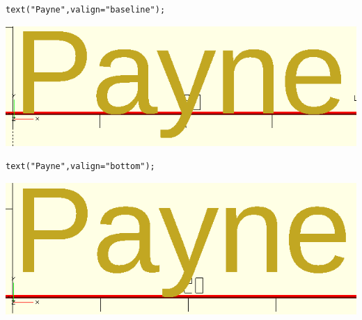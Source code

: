 \begin{center}
\begin{minipage}[]{.65\textwidth}%
 \begin{lstlisting}[numbers=none]
text("Payne",valign="baseline");
\end{lstlisting}%
\end{minipage}\hfill
\begin{minipage}[]{.35\textwidth}%
  \centering
  \includegraphics[width=.7\textwidth]{imagenes/payne-baseline}
\end{minipage}
\end{center}

\begin{center}
\begin{minipage}[]{.65\textwidth}%
 \begin{lstlisting}[numbers=none]
text("Payne",valign="bottom");
\end{lstlisting}%
\end{minipage}\hfill
\begin{minipage}[]{.35\textwidth}%
  \centering
  \includegraphics[width=.7\textwidth]{imagenes/payne-bottom}
\end{minipage}
\end{center}

